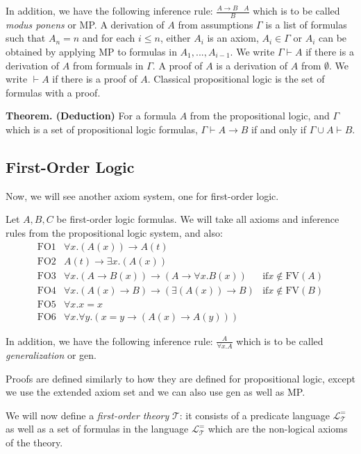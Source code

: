 In addition, we have the following inference rule: $\frac{A \to B~~~~A}{B}$ which is to be called 
\emph{modus ponens} or MP.
A derivation of $A$ from assumptions $\Gamma$ is a list of formulas such that $A_n = n$
and for each $i \leq n$, either $A_i$ is an axiom, $A_i \in \Gamma$ or $A_i$ can be obtained
by applying MP to formulas in $A_1, ..., A_{i - 1}$. We write $\Gamma \vdash A$ if there
is a derivation of $A$ from formuals in $\Gamma$. A proof of $A$ is a derivation
of $A$ from $\emptyset$. We write $\vdash A$ if there is a proof of $A$.
Classical propositional logic is the set of formulas with a proof.

\textbf{Theorem. (Deduction)} For a formula $A$ from the propositional logic, and $\Gamma$
which is a set of propositional logic formulas, $\Gamma \vdash A \to B$ if and only if 
$\Gamma \cup {A} \vdash B$.

\subsection{First-Order Logic}
Now, we will see another axiom system, one for first-order logic.

Let $A, B, C$ be first-order logic formulas. We will take all axioms and inference
rules from the propositional logic system, and also:
\[
\begin{array}{ccc}
\text{FO1}&\forall x. (A(x)) \to A(t)& \\
\text{FO2}&A(t) \to \exists x. (A(x))& \\
\text{FO3}&\forall x. (A \to B(x)) \to (A \to \forall x. B(x))& \text{if} x \notin \mathrm{FV}(A)\\
\text{FO4}&\forall x. (A(x) \to B) \to (\exists (A(x)) \to B)& \text{if} x \notin \mathrm{FV}(B) \\
\text{FO5}&\forall x. x = x& \\
\text{FO6}&\forall x. \forall y. (x = y \to (A(x) \to A(y)))& 
\end{array}
\]

In addition, we have the following inference rule: $\frac{A}{\forall x. A}$ which is to be called \emph{generalization}
or gen.

Proofs are defined similarly to how they are defined for propositional logic, except we use the extended
axiom set and we can also use gen as well as MP.

We will now define a \emph{first-order theory} $\mathcal{T}$: it consists of a predicate 
language $\mathcal{L}_\mathcal{T}^=$ as well as a set of formulas in the language $\mathcal{L}_\mathcal{T}^=$
which are the non-logical axioms of the theory.

